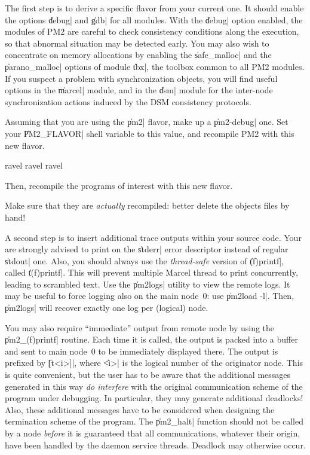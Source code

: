 The first step is to derive a specific flavor from your current one.
It should enable the options \|debug| and \|gdb| for all modules. With
the \|debug| option enabled, the modules of PM2 are careful to check
consistency conditions along the execution, so that abnormal situation
may be detected early. You may also wish to concentrate on memory
allocations by enabling the \|safe_malloc| and the \|parano_malloc|
options of module \|tbx|, the toolbox common to all PM2 modules. If
you suspect a problem with synchronization objects, you will find
useful options in the \|marcel| module, and in the \|dsm| module for
the inter-node synchronization actions induced by the DSM consistency
protocols.

Assuming that you are using the \|pm2| flavor, make up a
\|pm2-debug| one. Set your \|PM2_FLAVOR| shell variable to this value,
and recompile PM2 with this new flavor. 
\begin{shell}
ravel%
ravel%
ravel%
\end{shell}
Then, recompile the programs of interest with this new flavor. 

\begin{warning}
  Make sure that they are \emph{actually} recompiled: better delete
  the objects files by hand!
\end{warning}


A second step is to insert additional trace outputs within your source
code. Your are strongly advised to print on the \|stderr| error
descriptor instead of regular \|stdout| one. Also, you should always
use the \emph{thread-safe} version of \|(f)printf|, called \|t(f)printf|.
This will prevent multiple Marcel thread to print concurrently,
leading to scrambled text. Use the \|pm2logs| utility to view the
remote logs. It may be useful to force logging also on the main
node~0: use \|pm2load -l|. Then, \|pm2logs| will recover exactly one
log per (logical) node.

You may also require ``immediate'' output from remote node by using
the \|pm2_(f)printf| routine. Each time it is called, the output is
packed into a buffer and sent to main node~0 to be immediately
displayed there. The output is prefixed by \|[t<i>]|, where \|<i>| is
the logical number of the originator node.  This is quite convenient, but
the user has to be aware that the additional messages generated in
this way \emph{do interfere} with the original communication scheme of
the program under debugging. In particular, they may generate
additional deadlocks! Also, these additional messages have to be
considered when designing the termination scheme of the program. The
\|pm2_halt| function should not be called by a node \emph{before} it
is guaranteed that all communications, whatever their origin, have
been handled by the daemon service threads. Deadlock may otherwise
occur.

